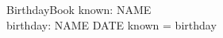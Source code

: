 \documentclass[15pt,preview,border=0pt]{standalone}
\begin{document}
\begin{schema}{BirthdayBook}
    known: \pset NAME \\
    birthday: NAME \pfun DATE
\ST
    known = \dom birthday
\end{schema}
\end{document}
